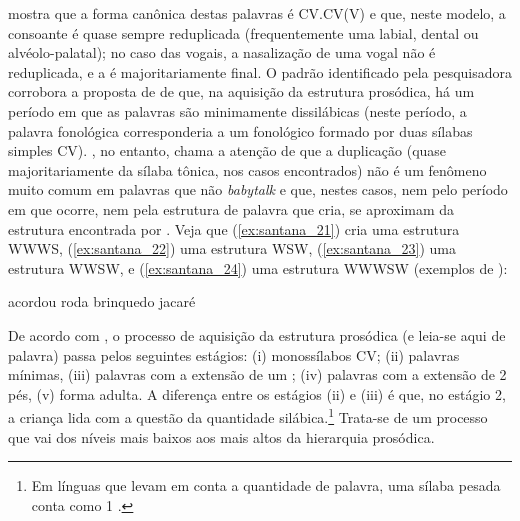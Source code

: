 \documentclass[output=paper]{LSP/langsci}
\begin{document}
\citeauthor{stoelgammon1976} mostra que a forma canônica destas palavras é CV.CV(V) e que, neste modelo, a consoante é quase sempre reduplicada (frequentemente uma labial, dental ou alvéolo-palatal); no caso das vogais, a nasalização de uma vogal não é reduplicada, e a  é majoritariamente final. O padrão identificado pela pesquisadora corrobora a proposta de \citet{demuth1996} de que, na aquisição da estrutura prosódica, há um período em que as palavras são minimamente dissilábicas (neste período, a palavra fonológica corresponderia a um  fonológico formado por duas sílabas simples CV). \citet{santos2001}, no entanto, chama a atenção de que a duplicação (quase majoritariamente da sílaba tônica, nos casos encontrados) não é um fenômeno muito comum em palavras que não \textit{babytalk} e que, nestes casos, nem pelo período em que ocorre, nem pela estrutura de palavra que cria, se aproximam da estrutura encontrada por \citeauthor{stoelgammon1976}. Veja que (\ref{ex:santana_21}) cria uma estrutura WWWS, (\ref{ex:santana_22}) uma estrutura WSW, (\ref{ex:santana_23}) uma estrutura WWSW, e (\ref{ex:santana_24}) uma estrutura WWWSW (exemplos de \citealt{santos2001}):

\ea\label{ex:santana_21} acordou\z
\ea\label{ex:santana_22}\ipa{[xa.\pstr a.da]} roda\z
\ea\label{ex:santana_23}\ipa{[b\~{i}.ke.\pstr e.du]} brinquedo\z
\ea\label{ex:santana_24}\ipa{[za.a.ka.\pstr lE.E]} jacaré\z

De acordo com \citet{demuth1996}, o processo de aquisição da estrutura prosódica (e leia-se aqui de palavra) passa pelos seguintes estágios: (i) monossílabos CV; (ii) palavras mínimas, (iii) palavras com a extensão de um ; (iv) palavras com a extensão de 2 pés, (v) forma adulta. A diferença entre os estágios (ii) e (iii) é que, no estágio 2, a criança lida com a questão da quantidade silábica.\footnote{Em línguas que levam em conta a quantidade de palavra, uma sílaba pesada conta como 1 .} Trata-se de um processo que vai dos níveis mais baixos aos mais altos da hierarquia prosódica. 
\end{document}

